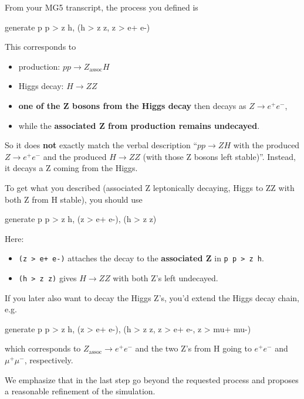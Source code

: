 \documentclass[submission, Phys]{SciPost}
\begin{document}
\begin{promptblock}[\ma]
From your MG5 transcript, the process you defined is

\begin{bashblock}
generate p p > z h, (h > z z, z > e+ e-)
\end{bashblock}

This corresponds to

\begin{itemize}[label=\textbullet]
  \item production: \(pp \to Z_\text{assoc} H\)
  \item Higgs decay: \(H \to Z Z\)
  \item \textbf{one of the Z bosons from the Higgs decay} then decays as \(Z \to e^+ e^-\),
  \item while the \textbf{associated Z from production remains undecayed}.
\end{itemize}

So it does \textbf{not} exactly match the verbal description “\(pp \to ZH\) with the produced \(Z \to e^+ e^-\) and the produced \(H \to ZZ\) (with those Z bosons left stable)”. Instead, it decays a Z coming from the Higgs.

To get what you described (associated Z leptonically decaying, Higgs to ZZ with both Z from H stable), you should use

\begin{bashblock}
generate p p > z h, (z > e+ e-), (h > z z)
\end{bashblock}

Here:
\begin{itemize}[label=\textbullet]
  \item \texttt{(z > e+ e-)} attaches the decay to the \textbf{associated Z} in \texttt{p p > z h}.
  \item \texttt{(h > z z)} gives \(H \to Z Z\) with both Z’s left undecayed.
\end{itemize}

If you later also want to decay the Higgs Z’s, you’d extend the Higgs decay chain, e.g.

\begin{bashblock}
generate p p > z h, (z > e+ e-), (h > z z, z > e+ e-, z > mu+ mu-)
\end{bashblock}

which corresponds to \(Z_\text{assoc} \to e^+ e^-\) and the two Z’s from H going to \(e^+ e^-\) and \(\mu^+ \mu^-\), respectively.
\end{promptblock}
% 
We emphasize that in the last step \ma go beyond the requested process and proposes a reasonable refinement of the simulation.
\end{document}

